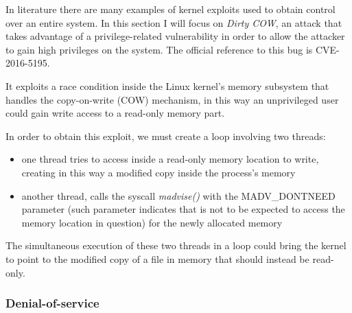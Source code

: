 \documentclass[a4paper,12pt]{article}
\begin{document}
In literature there are many examples of kernel exploits used to obtain control
over an entire system. In this section I will focus on \textit{Dirty COW}, an
attack that takes advantage of a privilege-related vulnerability in order to
allow the attacker to gain high privileges on the system. The official reference
to this bug is CVE-2016-5195.\par It exploits a race condition inside the Linux
kernel's memory subsystem that handles the copy-on-write (COW) mechanism, in
this way an unprivileged user could gain write access to a read-only memory
part\cite{red_hat_dirtycow}.\par In order to obtain this exploit, we must create
a loop involving two threads:
\begin{itemize}
  \item one thread tries to access inside a read-only memory location to
  write, creating in this way a modified copy inside the process's memory
  \item another thread, calls the syscall
  \textit{madvise()}\cite{madvise_description} with the MADV\_DONTNEED parameter
  (such parameter indicates that is not to be expected to access the memory
  location in question) for the newly allocated memory
  \end{itemize}
The simultaneous execution of these two threads in a loop could bring the
kernel to point to the modified copy of a file in memory that should instead be
read-only\cite{dirtycow_how_it_worrks}.

\subsubsection{Denial-of-service}
\end{document}
